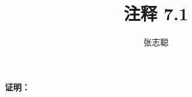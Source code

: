 \documentclass{article}
\begin{document}
\title{注释 7.1}
\author{张志聪}
\maketitle

\begin{zremark}
\end{zremark}

\textbf{证明：}
\end{document}
